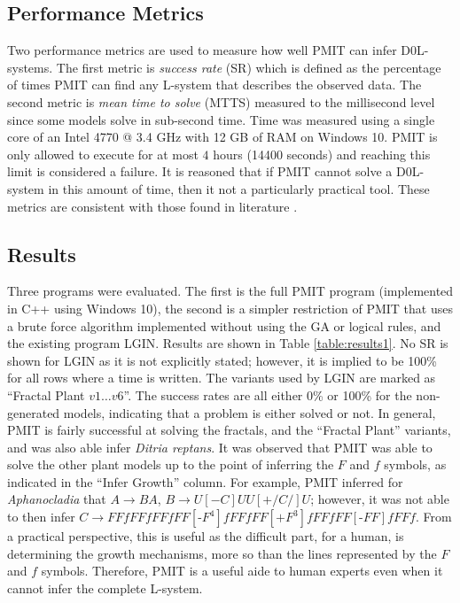 \documentclass{llncs}
\begin{document}
	\subsection{Performance Metrics}
	
	Two performance metrics are used to measure how well PMIT can infer D0L-systems. The first metric is \textit{success rate} (SR) which is defined as the percentage of times PMIT can find any L-system that describes the observed data. The second metric is \textit{mean time to solve} (MTTS) measured to the millisecond level since some models solve in sub-second time. Time was measured using a single core of an Intel 4770 @ 3.4 GHz with 12 GB of RAM on Windows 10. PMIT is only allowed to execute for at most $4$ hours (14400 seconds) and reaching this limit is considered a failure. It is reasoned that if PMIT cannot solve a D0L-system in this amount of time, then it not a particularly practical tool. These metrics are consistent with those found in literature \cite{nakano_inferD0Lerrorfree, runqiang_inferGA}.
	
	\subsection{Results}
	
	Three programs were evaluated. The first is the full PMIT program (implemented in C++ using Windows 10), the second is a simpler restriction of PMIT that uses a brute force algorithm implemented without using the GA or logical rules, and the existing program LGIN. Results are shown in Table \ref{table:results1}. No SR is shown for LGIN as it is not explicitly stated; however, it is implied to be 100\% \cite{nakano_inferD0Lerrorfree} for all rows where a time is written. The variants used by LGIN \cite{beauty, nakano_inferD0Lerrorfree} are marked as ``Fractal Plant $v1\ldots v6$''. The success rates are all either 0\% or 100\% for the non-generated models, indicating that a problem is either solved or not. In general, PMIT is fairly successful at solving the fractals, and the ``Fractal Plant'' variants, and was also able infer \textit{Ditria reptans}. It was observed that PMIT was able to solve the other plant models up to the point of inferring the $F$ and $f$ symbols, as indicated in the ``Infer Growth'' column. For example, PMIT inferred for \textit{Aphanocladia} that $A \to BA$, $B \to U[-C]UU[+/C/]U$; however, it was not able to then infer $C \rightarrow FFfFFfFFfFF[\text{-}F^{4}]fFFfFF[\text{+}F^{3}]fFFfFF[\text{-}FF]fFFf$. From a practical perspective, this is useful as the difficult part, for a human, is determining the growth mechanisms, more so than the lines represented by the $F$ and $f$ symbols. Therefore, PMIT is a useful aide to human experts even when it cannot infer the complete L-system.
	
\end{document}
